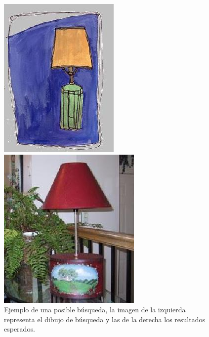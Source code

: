 \documentclass[conference]{IEEEtran}
\begin{document}
\begin{figure}[H]
\begin{multicols}{4}
    \includegraphics[width=0.95\linewidth]{image/lamp2.jpg} \par
    \includegraphics[width=0.95\linewidth]{image/lamp3.jpg} \par
\end{multicols}
\caption{Ejemplo de una posible búsqueda, la imagen de la izquierda representa el dibujo de búsqueda y las de la derecha los resultados esperados.}
\end{figure}
\end{document}
